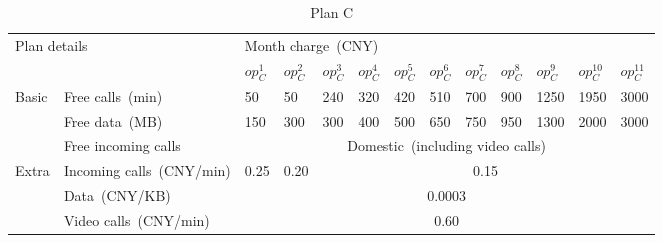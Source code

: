 \documentclass[10pt,journal,compsoc]{IEEEtran}
\begin{document}
\begin{table}[hbtp]
  \caption{Plan B}
  \label{table:chinaB}
  \centering
{}
\end{table}

\begin{table}[hbtp]
  \caption{Plan C}
  \label{table:chinaA}
  \centering
  \begin{tabular}{lllllllllllll} \toprule
  \multicolumn{2}{l}{\multirow{2}{*}{Plan details}}                 &\multicolumn{11}{l}{Month charge~(CNY)} \\ \cmidrule(lr){3-13}
  \multicolumn{2}{l}{}                                                        &\!$op_C^1$\!  &\!$op_C^2$\!  &\!$op_C^3$\!  &\!$op_C^4$\!  &\!$op_C^5$\!  &\!$op_C^6$\! &\!$op_C^7$\!  &\!$op_C^8$\!  &\!$op_C^9$\!  &\!$op_C^{10}$\!  &\!$op_C^{11}$\! \\ \midrule
  \multirow{3}{*}{Basic} &Free calls~(min)  &50  &50  &240  &320  &420  &510  &700 &900 &1250 &1950  &3000 \\
                                            &Free data~(MB)  &150 &300 &300  &400  &500  &650  &750 &950 &1300 &2000  &3000 \\
                                            &Free incoming calls  &\multicolumn{11}{c}{Domestic~(including video calls)} \\ \midrule
  \multirow{3}{*}{Extra} &Incoming calls~(CNY/min)  &0.25 &0.20  &\multicolumn{9}{c}{0.15} \\
                                           &Data~(CNY/KB)  &\multicolumn{11}{c}{0.0003} \\
                                            &Video calls~(CNY/min)  &\multicolumn{11}{c}{0.60} \\ \bottomrule
  \end{tabular}
\end{table}
\end{document}
